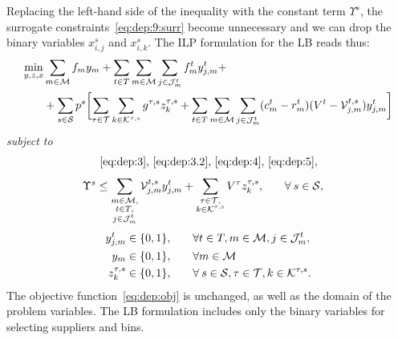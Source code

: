 \documentclass[a4paper,11pt]{article}
\begin{document}
	Replacing the left-hand side of the inequality with the constant term $ \Upsilon^s$, the surrogate constraints~\eqref{eq:dep:9:surr} become unnecessary and we can drop the binary variables $x_{i,j}^{s}$ and $ x_{i,k}^{s}$.
	The ILP formulation for the LB reads thus:
	\begin{equation*}
	\begin{split}
		\min_{y,z,x} & \sum_{m \in \cal M} {f_{m}}y_{m} +  \sum_{t \in T} \sum_{m \in {{\cal M}}} \sum_{j \in {\cal J}_{m}^t} f_{m}^t y_{j,m}^t + \\
		& + \sum_{s \in \cal S} p^{s} \biggl [ \sum_{\tau \in \cal T} \sum_{k \in {\cal K}^{\tau,s}} g^{\tau,s} z_k^{\tau,s} + \sum_{t \in T} \sum_{m \in {\cal M}} \sum_{j \in {\cal J}^t_{m}} (c_{m}^t-r_{m}^t)(V^{t} - {\cal V}_{j,m}^{t,s}) y_{j,m}^t \biggr]
	\end{split}
	\end{equation*}
	\textit{subject to}
	\begin{equation*}
		\eqref{eq:dep:3}, \, \eqref{eq:dep:3.2}, \, \eqref{eq:dep:4}, \, \eqref{eq:dep:5},
	\end{equation*}
	\begin{alignat}{2}		
		\Upsilon^s
		\leq \sum\limits_{\substack{ m \in {\cal M}, \\ t \in T, \\ j \in {\cal J}^t_{m}}} {\cal V}_{j,m}^{t,s} y_{j,m}^t + \sum\limits_{\substack{\tau \in {\cal T}, \\ k \in {\cal K}^{\tau,s}}} V^{\tau} z_k^{\tau,s}, & \qquad \forall \: s \in {\cal S},\label{eq:deplb:10}
	\end{alignat}
	\begin{alignat*}{2}		
		y_{j,m}^t \in \{0, 1\}, & \qquad \forall t \in T, m \in {\cal M}, j \in {\cal J}^t_{m},\\
		y_{m} \in \{0, 1\}, & \qquad \forall m \in \cal M \\
		z_k^{\tau,s} \in \{0, 1\}, & \qquad \forall \: s \in {\cal S}, \tau \in {\cal T} , k \in {\cal K}^{\tau,s}.
	\end{alignat*}
	The objective function~\eqref{eq:dep:obj} is unchanged, as well as the domain of the problem variables.
	The LB formulation includes only the binary variables for selecting suppliers and bins.
	
\end{document}

